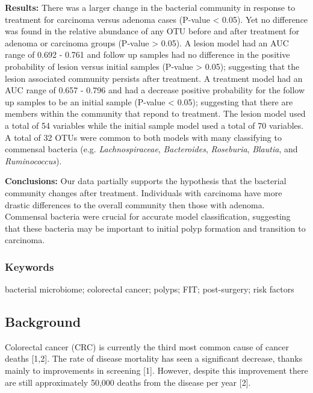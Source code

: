 \documentclass[12pt,]{article}
\begin{document}
\textbf{Results:} There was a larger change in the bacterial community
in response to treatment for carcinoma versus adenoma cases (P-value
\textless{} 0.05). Yet no difference was found in the relative abundance
of any OTU before and after treatment for adenoma or carcinoma groups
(P-value \textgreater{} 0.05). A lesion model had an AUC range of 0.692
- 0.761 and follow up samples had no difference in the positive
probability of lesion versus initial samples (P-value \textgreater{}
0.05); suggesting that the lesion associated community persists after
treatment. A treatment model had an AUC range of 0.657 - 0.796 and had a
decrease positive probability for the follow up samples to be an initial
sample (P-value \textless{} 0.05); suggesting that there are members
within the community that repond to treatment. The lesion model used a
total of 54 variables while the initial sample model used a total of 70
variables. A total of 32 OTUs were common to both models with many
classifying to commensal bacteria (e.g. \emph{Lachnospiraceae},
\emph{Bacteroides}, \emph{Roseburia}, \emph{Blautia}, and
\emph{Ruminococcus}).

\textbf{Conclusions:} Our data partially supports the hypothesis that
the bacterial community changes after treatment. Individuals with
carcinoma have more drastic differences to the overall community then
those with adenoma. Commensal bacteria were crucial for accurate model
classification, suggesting that these bacteria may be important to
initial polyp formation and transition to carcinoma.

\newpage

\subsubsection{Keywords}\label{keywords}

bacterial microbiome; colorectal cancer; polyps; FIT; post-surgery; risk
factors

\newpage

\subsection{Background}\label{background}

Colorectal cancer (CRC) is currently the third most common cause of
cancer deaths {[}1,2{]}. The rate of disease mortality has seen a
significant decrease, thanks mainly to improvements in screening
{[}1{]}. However, despite this improvement there are still approximately
50,000 deaths from the disease per year {[}2{]}.
\end{document}
